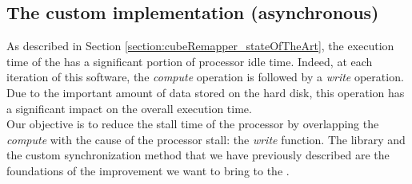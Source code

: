 	\subsection{The \toolTargetSoftware\space custom implementation (asynchronous)} \label{subsection:remapperPattern}
		As described in Section \ref{section:cubeRemapper_stateOfTheArt}, the execution time of the \toolTargetSoftware\space has a significant portion of processor idle time.   Indeed, at each iteration of this software, the \emph{compute} operation is followed by a \emph{write} operation.   Due to the important amount of data stored on the hard disk, this operation has a significant impact on the overall execution time.\\
		Our objective is to reduce the stall time of the processor by overlapping the \emph{compute} with the cause of the processor stall: the \notationIO\space \emph{write} function.   The \notationaioShort\space library and the custom synchronization method that we have previously described are the foundations of the improvement we want to bring to the \toolTargetSoftware.\\

